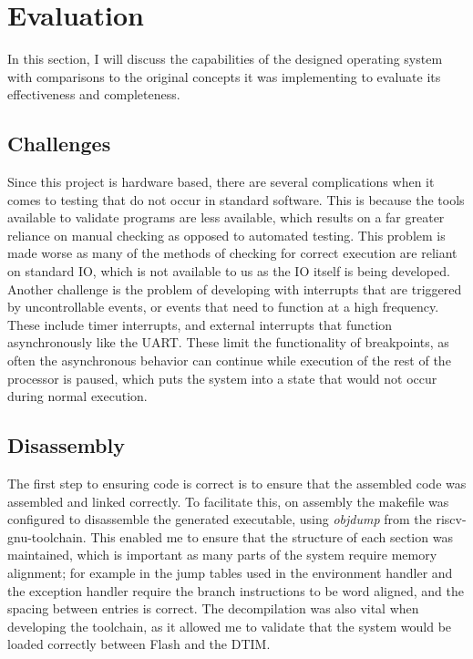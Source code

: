 \chapter[Evaluation]{Evaluation}
\label{cha:eval}
In this section, I will discuss the capabilities of the designed operating system with comparisons to the original concepts it was implementing to evaluate its effectiveness and completeness.
\section{Challenges}
Since this project is hardware based, there are several complications when it comes to testing that do not occur in standard software. This is because the tools available to validate programs are less available, which results on a far greater reliance on manual checking as opposed to automated testing. This problem is made worse as many of the methods of checking for correct execution are reliant on standard IO, which is not available to us as the IO itself is being developed.\\
Another challenge is the problem of developing with interrupts that are triggered by uncontrollable events, or events that need to function at a high frequency. These include timer interrupts, and external interrupts that function asynchronously like the UART. These limit the functionality of breakpoints, as often the asynchronous behavior can continue while execution of the rest of the processor is paused, which puts the system into a state that would not occur during normal execution.
\section{Disassembly}%
The first step to ensuring code is correct is to ensure that the assembled code was assembled and linked correctly. To facilitate this, on assembly the makefile was configured to disassemble the generated executable, using \textit{objdump} from the riscv-gnu-toolchain. This enabled me to ensure that the structure of each section was maintained, which is important as many parts of the system require memory alignment; for example in the jump tables used in the environment handler and the exception handler require the branch instructions to be word aligned, and the spacing between entries is correct. The decompilation was also vital when developing the toolchain, as it allowed me to validate that the system would be loaded correctly between Flash and the DTIM.
